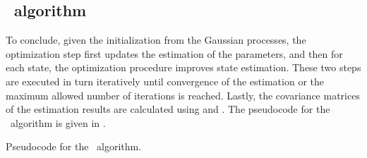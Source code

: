 \subsection*{\algolpmf\ algorithm}

To conclude, given the initialization from the Gaussian processes, the optimization step  first updates the estimation of the parameters, and then for each state, the optimization procedure  improves state estimation.
These two steps are executed in turn iteratively until convergence of the estimation or the maximum allowed number of iterations is reached.
Lastly, the covariance matrices of the estimation results are calculated using  and .
The pseudocode for the \algolpmf\ algorithm is given in .

\begin{algorithm}
    \centering
    \caption{Pseudocode for the \algolpmf\ algorithm.}
    \label{algo-lpmf}
    \begin{algorithmic}[1]
            \State 
        \EndFor
        \State
            \State 

                \State 
            \EndFor                            
        \EndWhile
        \State
        \State
            \State
        \EndFor
    \end{algorithmic}
\end{algorithm}

